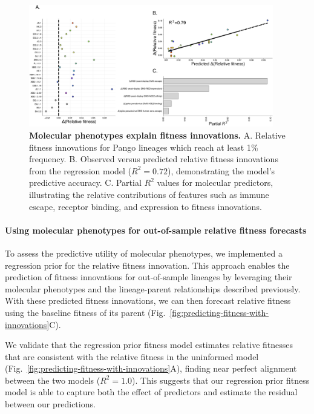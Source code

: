 \begin{figure}[h]
	\centering
	\includegraphics[width=0.95\textwidth]{./figures/explaining-fitness-innovations.png}
	\caption{\textbf{Molecular phenotypes explain fitness innovations.}
	    A. Relative fitness innovations for Pango lineages which reach at least 1\% frequency.
	    B. Observed versus predicted relative fitness innovations from the regression model ($R^2 = 0.72$), demonstrating the model’s predictive accuracy.
	    C. Partial $R^2$ values for molecular predictors, illustrating the relative contributions of features such as immune escape, receptor binding, and expression to fitness innovations.
	}
	\label{fig:explaining-fitness-innovations}
\end{figure}

\paragraph{Using molecular phenotypes for out-of-sample relative fitness forecasts}

To assess the predictive utility of molecular phenotypes, we implemented a regression prior for the relative fitness innovation. This approach enables the prediction of fitness innovations for out-of-sample lineages by leveraging their molecular phenotypes and the lineage-parent relationships described previously.
With these predicted fitness innovations, we can then forecast relative fitness using the baseline fitness of its parent (Fig.~\ref{fig:predicting-fitness-with-innovations}C).

We validate that the regression prior fitness model estimates relative fitnesses that are consistent with the relative fitness in the uninformed model (Fig.~\ref{fig:predicting-fitness-with-innovations}A), finding near perfect alignment between the two models ($R^2 = 1.0$).
This suggests that our regression prior fitness model is able to capture both the effect of predictors and estimate the residual between our predictions.

